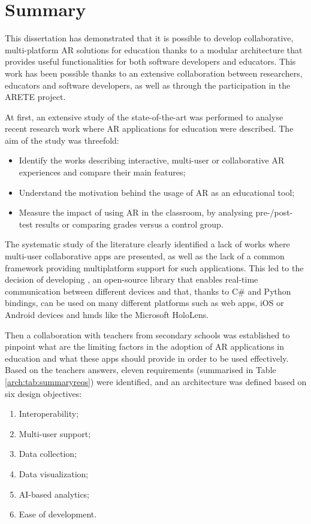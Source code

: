 \section{Summary}
This dissertation has demonstrated that it is possible to develop collaborative, multi-platform AR solutions for education thanks to a modular architecture that provides useful functionalities for both software developers and educators. This work has been possible thanks to an extensive collaboration between researchers, educators and software developers, as well as through the participation in the ARETE project. 

At first, an extensive study of the state-of-the-art was performed to analyse recent research work where AR applications for education were described. The aim of the study was threefold:
\begin{itemize}
    \item Identify the works describing interactive, multi-user or collaborative AR experiences and compare their main features;
    \item Understand the motivation behind the usage of AR as an educational tool;
    \item Measure the impact of using AR in the classroom, by analysing pre-/post- test results or comparing grades versus a control group.
\end{itemize}

The systematic study of the literature clearly identified a lack of works where multi-user collaborative apps are presented, as well as the lack of a common framework providing multiplatform support for such applications. This led to the decision of developing \ork{}, an open-source library that enables real-time communication between different devices and that, thanks to C\# and Python bindings, can be used on many different platforms such as web apps, iOS or Android devices and \glspl{hmd} like the Microsoft HoloLens.

Then a collaboration with teachers from secondary schools was established to pinpoint what are the limiting factors in the adoption of AR applications in education and what these apps should provide in order to be used effectively. Based on the teachers answers, eleven requirements (summarised in Table \ref{arch:tab:summaryreqs}) were identified, and an architecture was defined based on six design objectives:
\begin{enumerate}[start=1,label={\bfseries DO\arabic*:}]
    \item Interoperability;
    \item Multi-user support;
    \item Data collection;
    \item Data visualization;
    \item AI-based analytics;
    \item Ease of development.
\end{enumerate}

